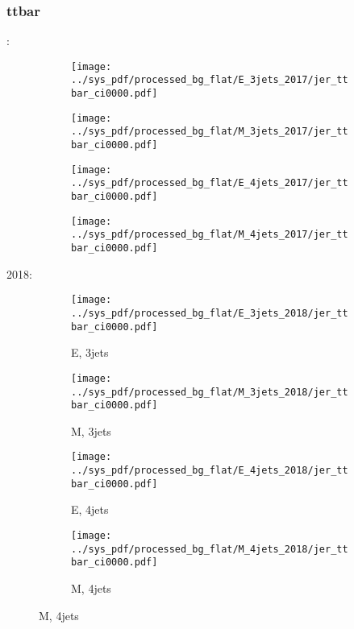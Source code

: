 \documentclass{beamer}
\begin{document}
\begin{frame}
\frametitle{ttbar}
\fontsize{5}{1}:
\begin{figure}
\centering
\begin{subfigure}[b]{0.24\textwidth}
\texttt{[image: ../sys\_pdf/processed\_bg\_flat/E\_3jets\_2017/jer\_ttbar\_ci0000.pdf]}
\end{subfigure}
\begin{subfigure}[b]{0.24\textwidth}
\texttt{[image: ../sys\_pdf/processed\_bg\_flat/M\_3jets\_2017/jer\_ttbar\_ci0000.pdf]}
\end{subfigure}
\begin{subfigure}[b]{0.24\textwidth}
\texttt{[image: ../sys\_pdf/processed\_bg\_flat/E\_4jets\_2017/jer\_ttbar\_ci0000.pdf]}
\end{subfigure}
\begin{subfigure}[b]{0.24\textwidth}
\texttt{[image: ../sys\_pdf/processed\_bg\_flat/M\_4jets\_2017/jer\_ttbar\_ci0000.pdf]}
\end{subfigure}
\end{figure}
2018:
\begin{figure}
\centering
\begin{subfigure}[b]{0.24\textwidth}
\texttt{[image: ../sys\_pdf/processed\_bg\_flat/E\_3jets\_2018/jer\_ttbar\_ci0000.pdf]}
\captionsetup{font=tiny}
\caption{E, 3jets}
\end{subfigure}
\begin{subfigure}[b]{0.24\textwidth}
\texttt{[image: ../sys\_pdf/processed\_bg\_flat/M\_3jets\_2018/jer\_ttbar\_ci0000.pdf]}
\captionsetup{font=tiny}
\caption{M, 3jets}
\end{subfigure}
\begin{subfigure}[b]{0.24\textwidth}
\texttt{[image: ../sys\_pdf/processed\_bg\_flat/E\_4jets\_2018/jer\_ttbar\_ci0000.pdf]}
\captionsetup{font=tiny}
\caption{E, 4jets}
\end{subfigure}
\begin{subfigure}[b]{0.24\textwidth}
\texttt{[image: ../sys\_pdf/processed\_bg\_flat/M\_4jets\_2018/jer\_ttbar\_ci0000.pdf]}
\captionsetup{font=tiny}
\caption{M, 4jets}
\end{subfigure}
\end{figure}
\end{frame}
\end{document}
